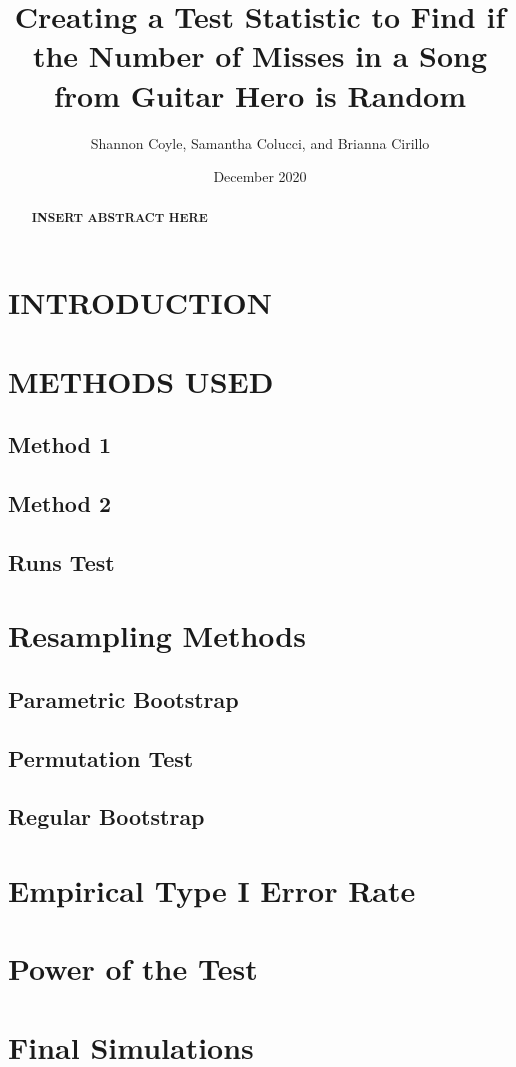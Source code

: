 \documentclass[12pt, letterpaper]{article}
\title{Creating a Test Statistic to Find if the Number of Misses in a Song from Guitar Hero is Random}
\author{Shannon Coyle, Samantha Colucci, and Brianna Cirillo}
\date{December 2020}
\begin{document}
\maketitle

\begin{abstract}
\textbf{INSERT ABSTRACT HERE}
\end{abstract}

\section{INTRODUCTION}

\section{METHODS USED}

\subsection{Method 1}

\subsection{Method 2}
\subsection{Runs Test}

\section{Resampling Methods}

\subsection{Parametric Bootstrap}
\subsection{Permutation Test}
\subsection{Regular Bootstrap}

\section{Empirical Type I Error Rate}

\section{Power of the Test}

\section{Final Simulations}
\end{document}
